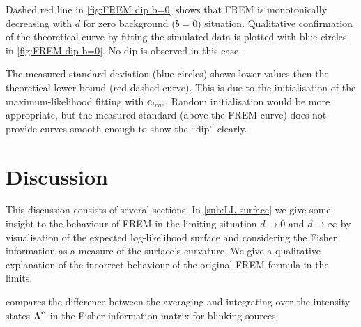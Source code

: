 Dashed red line in \autoref{fig:FREM dip b=0} shows that FREM is monotonically decreasing with $d$ for zero background ($b=0$) situation. Qualitative confirmation of the theoretical curve by fitting the simulated data is plotted with blue circles in \autoref{fig:FREM dip b=0}. No dip is observed in this case. 

The measured standard deviation (blue circles) shows lower values then the theoretical lower bound (red dashed curve). This is due to the initialisation of the maximum-likelihood fitting with $\bm{c}_{true}$. Random initialisation would be more appropriate, but the measured standard (above the FREM curve) does not provide curves smooth enough to show the ``dip'' clearly. 


\clearpage
\section{Discussion\label{sec:FREM discussion}}
This discussion consists of several sections. In \autoref{sub:LL surface} we give some insight to the behaviour of FREM in the limiting situation $d\rightarrow0$ and $d\rightarrow\infty$ by visualisation of the expected log-likelihood surface and considering the Fisher information as a measure of the surface's curvature. We give a qualitative explanation of the incorrect behaviour of the original FREM formula in the limits.  

 compares the difference between the averaging and integrating over the intensity states $\bm{\Lambda^\alpha}$ in the Fisher information matrix for blinking sources.

